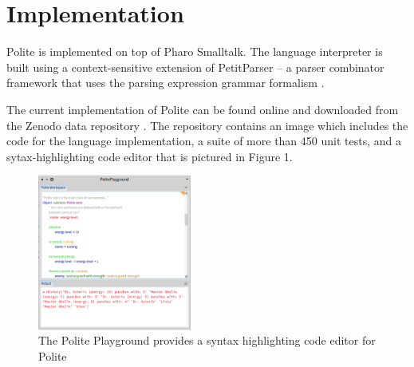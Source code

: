 

\section{Implementation}
Polite is implemented on top of Pharo Smalltalk. The language interpreter is built using a context-sensitive extension of PetitParser -- a parser combinator framework that uses the parsing expression grammar formalism \cite{Kurs14a-ParsingContext}. 

The current implementation of Polite can be found online and downloaded from  the Zenodo data repository \cite{kurs16-polite}. The repository contains an image which includes the code for the language implementation, a suite of more than 450 unit tests, and a sytax-highlighting code editor that is pictured in Figure 1. 

\begin{figure}[h]
	\centering
	\includegraphics[width=0.45\textwidth]{images/playground.png}
	\caption{The Polite Playground provides a syntax highlighting code editor for Polite}
	\label{fig:figure1}
\end{figure}